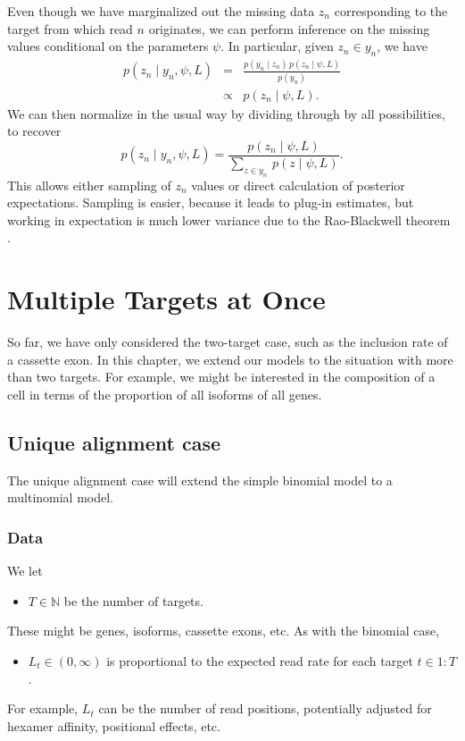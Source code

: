 \documentclass[11pt]{report}
\newcommand{\rngto}[1]{1{:}#1}
\begin{document}
Even though we have marginalized out the missing data $z_n$
corresponding to the target from which read $n$ originates, we
can perform inference on the missing values conditional on the
parameters $\psi$.  In particular, given $z_n \in y_n$, we have
%
\begin{eqnarray*}
  p(z_n \mid y_n, \psi, L) & = & \frac{p(y_n \mid z_n) \, p(z_n \mid \psi, L)}{p(y_n)}
  \\
  & \propto & p(z_n \mid \psi, L).
\end{eqnarray*}
%
We can then normalize in the usual way by dividing through by all
possibilities, to recover
\[
  p(z_n \mid y_n, \psi, L)
  = \frac{p(z_n \mid \psi, L)}
         {\sum_{z \in y_n} \, p(z \mid \psi, L)}.
\]
This allows either sampling of $z_n$ values or direct calculation of
posterior expectations.  Sampling is easier, because it leads to
plug-in estimates, but working in expectation is much lower variance
due to the Rao-Blackwell theorem \citep[Section~4.2]{robert2004monte}.



\chapter{Multiple Targets at Once}

So far, we have only considered the two-target case, such as the
inclusion rate of a cassette exon.  In this chapter, we extend our
models to the situation with more than two targets.  For example, we
might be interested in the composition of a cell in terms of the
proportion of all isoforms of all genes.

\section{Unique alignment case}

The unique alignment case will extend the simple binomial model to a
multinomial model.

\subsection{Data}

We let
%
\begin{itemize}
\item $T \in \mathbb{N}$ be the number of targets.
\end{itemize}
%
These might be genes, isoforms, cassette exons, etc.  As with the
binomial case,
%
\begin{itemize}
\item $L_t \in (0, \infty)$ is proportional to the expected read rate
  for each target $t \in \rngto{T}$.
\end{itemize}
%
For example, $L_t$ can be the number of read positions, potentially
adjusted for hexamer affinity, positional effects, etc.
\end{document}
